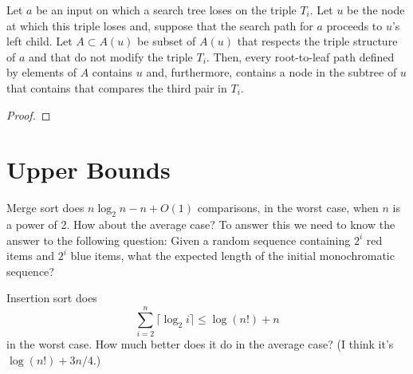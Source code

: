 \documentclass{patmorin}
\begin{document}
Let $a$ be an input on which a search tree loses on the triple $T_i$.
Let $u$ be the node at which this triple loses and, suppose that the
search path for $a$ proceeds to $u$'s left child.  Let $A\subset A(u)$
be subset of $A(u)$ that respects the triple structure of $a$ and
 that do not modify the triple $T_i$.  Then, every root-to-leaf path
 defined by elements of $A$ contains $u$ and, furthermore, contains a
 node in the subtree of $u$ that contains that compares the third pair
 in $T_i$.
\begin{proof}

\end{proof}

\section{Upper Bounds}

Merge sort does $n\log_2n - n +O(1)$ comparisons, in the worst case,
when $n$ is a power of 2.  How about the average case?  To answer this
we need to know the answer to the following question: Given a random
sequence containing $2^i$ red items and $2^i$ blue items, what the
expected length of the initial monochromatic sequence?

Insertion sort does
\[
   \sum_{i=2}^{n}\lceil\log_2 i\rceil \le \log(n!) + n
\]
in the worst case.  How much better does it do in the average case?
(I think it's $\log(n!)+3n/4$.)
\end{document}
